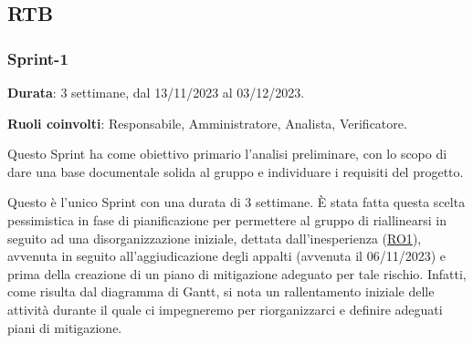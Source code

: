 \subsection{RTB}

    \subsubsection{Sprint-1} \label{sec:pianificazione-S1}
    \textbf{Durata}: 3 settimane, dal 13/11/2023 al 03/12/2023.
    
    \noindent
    \textbf{Ruoli coinvolti}: Responsabile, Amministratore, Analista, Verificatore.

    \vspace{0.3cm}
    \noindent
    Questo Sprint ha come obiettivo primario l'analisi preliminare, con lo scopo di dare una base documentale solida al gruppo e individuare i requisiti del progetto.
    
    \vspace{0.3cm}
    \noindent
    Questo è l'unico Sprint con una durata di 3 settimane. È stata fatta questa scelta pessimistica in fase di pianificazione per permettere al gruppo di riallinearsi in seguito ad una disorganizzazione iniziale, dettata dall'inesperienza (\hyperref[sec:RO1]{RO1}), avvenuta in seguito all'aggiudicazione degli appalti (avvenuta il 06/11/2023) e prima della creazione di un piano di mitigazione adeguato per tale rischio. Infatti, come risulta dal diagramma di Gantt, si nota un rallentamento iniziale delle attività durante il quale ci impegneremo per riorganizzarci e definire adeguati piani di mitigazione.


